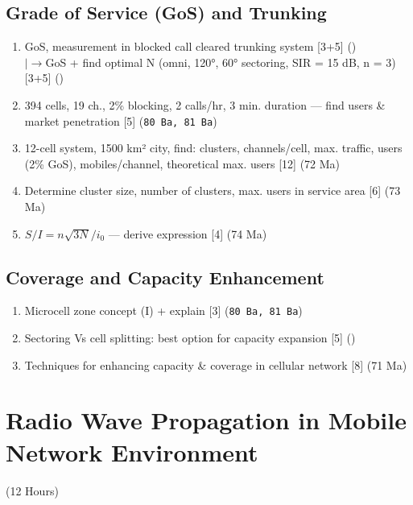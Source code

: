 \documentclass[12pt]{article}
\newcommand{\lb}{\\$\left|\rightarrow\right.$}
\begin{document}
  \subsection{Grade of Service (GoS) and Trunking}
    \begin{enumerate}[topsep=0pt, noitemsep]
      \item GoS, measurement in blocked call cleared trunking system \hfill [3+5] ()
        \lb GoS + find optimal N (omni, 120°, 60° sectoring, SIR = 15 dB, n = 3) \hfill [3+5] ()
      \item 394 cells, 19 ch., 2\% blocking, 2 calls/hr, 3 min. duration
        --- find users \& market penetration \hfill [5] (\texttt{80 Ba, 81 Ba})
      \item 12-cell system, 1500 km² city, find: clusters, channels/cell,
        max. traffic, users (2\% GoS), mobiles/channel, theoretical max. users \hfill [12] (72 Ma)
      \item Determine cluster size, number of clusters, max. users in service area \hfill [6] (73 Ma)
      \item $S/I = n\sqrt{3N}/i_0$ --- derive expression \hfill [4] (74 Ma)
    \end{enumerate}

  \subsection{Coverage and Capacity Enhancement}
    \begin{enumerate}[topsep=0pt, noitemsep]
      \item Microcell zone concept (I) + explain \hfill [3] (\texttt{80 Ba, 81 Ba})
      \item Sectoring Vs cell splitting: best option for capacity expansion \hfill [5] ()
      \item Techniques for enhancing capacity \& coverage in cellular network \hfill [8] (71 Ma)
    \end{enumerate}

\pagebreak
\section{Radio Wave Propagation in Mobile Network Environment}
\begin{center}(12 Hours)\end{center}
\end{document}
